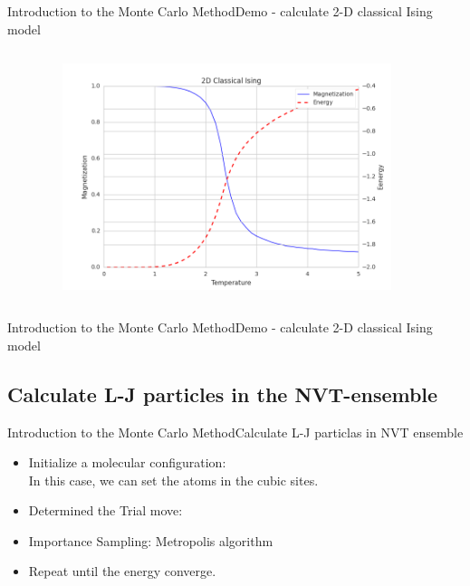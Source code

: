 \documentclass{beamer}
\begin{document}
\begin{frame}{Introduction to the Monte Carlo Method}{Demo - calculate 2-D classical Ising model}
	\begin{columns}[c]
		\begin{column}[T]{4cm}
		\end{column}
		\begin{column}[T]{8cm}
				\begin{figure}
					\includegraphics[width=0.9\textwidth]{figures/2DIsingEM.png}
					\label{2DI}
				\end{figure}
		\end{column}
	\end{columns}
\end{frame}

\begin{frame}{Introduction to the Monte Carlo Method}{Demo - calculate 2-D classical Ising model}
\end{frame}

\subsection{Calculate L-J particles in the NVT-ensemble}
\begin{frame}{Introduction to the Monte Carlo Method}{Calculate L-J particlas in NVT ensemble}

\begin{itemize}
	\item Initialize a molecular configuration: \\
		In this case, we can set the atoms in the cubic sites.
	\item Determined the Trial move:
	\item Importance Sampling: Metropolis algorithm
	\item Repeat until the energy converge.
\end{itemize}
\end{frame}
\end{document}
